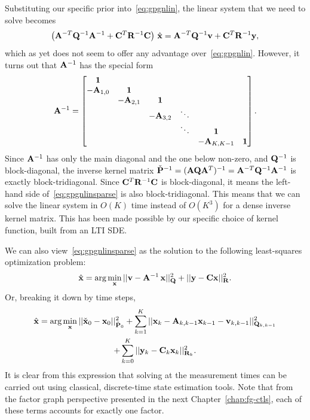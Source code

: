 Substituting our specific prior into~\eqref{eq:gpgnlin}, the linear system that we need to solve becomes
\begin{equation}
\label{eq:gpgnlinsparse}
\left( \mathbf{A}^{-T} \mathbf{Q}^{-1} \mathbf{A}^{-1} + \mathbf{C}^T \mathbf{R}^{-1} \mathbf{C} \right) \, \hat{\mathbf{x}} =  \mathbf{A}^{-T} \mathbf{Q}^{-1} \mathbf{v} + \mathbf{C}^T \mathbf{R}^{-1}\mathbf{y},
\end{equation}
which as yet does not seem to offer any advantage over~\eqref{eq:gpgnlin}.  However, it turns out that $\mathbf{A}^{-1}$ has the special form
\begin{equation}
\mathbf{A}^{-1} = \begin{bmatrix} \mathbf{1} &  & &  &  &  \\
-\mathbf{A}_{1,0} & \mathbf{1} &  &  &  &  \\
& -\mathbf{A}_{2,1} & \mathbf{1} & &  &  \\
 &  & -\mathbf{A}_{3,2} & \ddots &  &  \\
 &  & & \ddots & \mathbf{1} &  \\
 &  &  &  & -\mathbf{A}_{K,K-1} & \mathbf{1}
\end{bmatrix}.
\end{equation}
Since $\mathbf{A}^{-1}$ has only the main diagonal and the one below non-zero, and $\mathbf{Q}^{-1}$ is block-diagonal, the inverse kernel matrix $\check{\mathbf{P}}^{-1} = (\mathbf{A}\mathbf{Q}\mathbf{A}^T)^{-1} = \mathbf{A}^{-T} \mathbf{Q}^{-1} \mathbf{A}^{-1}$ is exactly block-tridiagonal.  Since $\mathbf{C}^T \mathbf{R}^{-1} \mathbf{C}$ is block-diagonal, it means the left-hand side of~\eqref{eq:gpgnlinsparse} is also block-tridiagonal.  This means that we can solve the linear system in $O(K)$ time instead of $O(K^3)$ for a dense inverse kernel matrix.  This has been made possible by our specific choice of kernel function, built from an \ac{LTI} \ac{SDE}.

We can also view~\eqref{eq:gpgnlinsparse} as the solution to the following least-squares optimization problem:
\begin{equation}
\hat{\mathbf{x}} = \mbox{arg}\min_{\mathbf{x}} || \mathbf{v} - \mathbf{A}^{-1}\,\mathbf{x} ||^2_{\mathbf{Q}} + || \mathbf{y} - \mathbf{C}\mathbf{x}||^2_{\mathbf{R}}.
\end{equation}
Or, breaking it down by time steps,
\begin{multline}
\hat{\mathbf{x}} = \mbox{arg}\min_{\mathbf{x}} || \check{\mathbf{x}}_0 - \mathbf{x}_0 ||^2_{\check{\mathbf{P}}_0} + \sum_{k=1}^K || \mathbf{x}_k - \mathbf{A}_{k,k-1} \mathbf{x}_{k-1} - \mathbf{v}_{k,k-1} ||^2_{\mathbf{Q}_{k,k-1}} \\ + \sum_{k=0}^K || \mathbf{y}_k - \mathbf{C}_k \mathbf{x}_k||^2_{\mathbf{R}_k}.
\end{multline}
It is clear from this expression that solving at the measurement times can be carried out using classical, discrete-time state estimation tools. Note that from the factor graph perspective presented in the next Chapter~\ref{chap:fg-ctls}, each of these terms accounts for exactly one factor.

